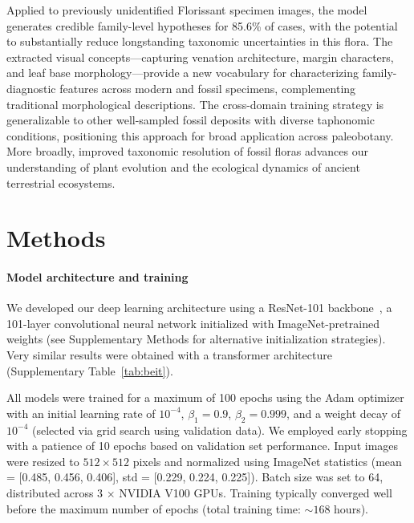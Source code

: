 \documentclass[pdflatex,lineno,sn-nature]{sn-jnl}%
\theoremstyle{plain}%
\theoremstyle{definition}%
\theoremstyle{remark}%
\begin{document}
Applied to previously unidentified Florissant specimen images, the model generates credible family-level hypotheses for 85.6\% of cases, with the potential to substantially reduce longstanding taxonomic uncertainties in this flora. The extracted visual concepts---capturing venation architecture, margin characters, and leaf base morphology---provide a new vocabulary for characterizing family-diagnostic features across modern and fossil specimens, complementing traditional morphological descriptions. The cross-domain training strategy is generalizable to other well-sampled fossil deposits with diverse taphonomic conditions, positioning this approach for broad application across paleobotany. More broadly, improved taxonomic resolution of fossil floras advances our understanding of plant evolution and the ecological dynamics of ancient terrestrial ecosystems.


\section*{Methods}

\paragraph{Model architecture and training}

We developed our deep learning architecture using a ResNet-101 backbone~\citep{resnetHe2015}, 
a 101-layer convolutional neural network initialized with ImageNet-pretrained weights (see 
Supplementary Methods for alternative initialization strategies). Very similar results 
were obtained with a transformer architecture (Supplementary Table~\ref{tab:beit}).

All models were trained for a maximum of 100 epochs using the Adam optimizer~\citep{kingma2014adam} with an initial learning rate of $10^{-4}$, $\beta_1 = 0.9$, $\beta_2 = 0.999$, and a weight decay of $10^{-4}$ (selected via grid search using validation data). We employed early stopping with a patience of 10 epochs based on validation set performance. Input images were resized to $512 \times 512$ pixels and normalized using ImageNet statistics (mean = [0.485, 0.456, 0.406], std = [0.229, 0.224, 0.225]). Batch size was set to 64, distributed across 3 $\times$ NVIDIA V100 GPUs. Training typically converged well before the maximum number of epochs (total training time: $\sim 168$ hours). 
\end{document}
